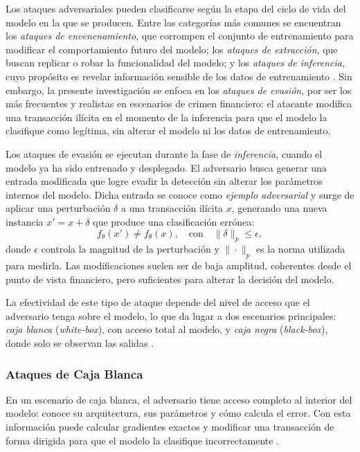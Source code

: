 Los ataques adversariales pueden clasificarse según la etapa del ciclo de vida del modelo en la que se producen. Entre las categorías más comunes se encuentran los \textit{ataques de envenenamiento}, que corrompen el conjunto de entrenamiento para modificar el comportamiento futuro del modelo; los \textit{ataques de extracción}, que buscan replicar o robar la funcionalidad del modelo; y los \textit{ataques de inferencia}, cuyo propósito es revelar información sensible de los datos de entrenamiento \cite{huang2011adversarial}. Sin embargo, la presente investigación se enfoca en los \textit{ataques de evasión}, por ser los más frecuentes y realistas en escenarios de crimen financiero: el atacante modifica una transacción ilícita en el momento de la inferencia para que el modelo la clasifique como legítima, sin alterar el modelo ni los datos de entrenamiento.

Los ataques de evasión se ejecutan durante la fase de \textit{inferencia}, cuando el modelo ya ha sido entrenado y desplegado. El adversario busca generar una entrada modificada que logre evadir la detección sin alterar los parámetros internos del modelo. Dicha entrada se conoce como \textit{ejemplo adversarial} y surge de aplicar una perturbación $\delta$ a una transacción ilícita $x$, generando una nueva instancia $x' = x + \delta$ que produce una clasificación errónea:
\[
f_\theta(x') \neq f_\theta(x), \quad \text{con} \quad \|\delta\|_p \leq \epsilon,
\]
donde $\epsilon$ controla la magnitud de la perturbación y $\|\cdot\|_p$ es la norma utilizada para medirla. Las modificaciones suelen ser de baja amplitud, coherentes desde el punto de vista financiero, pero suficientes para alterar la decisión del modelo.

La efectividad de este tipo de ataque depende del nivel de acceso que el adversario tenga sobre el modelo, lo que da lugar a dos escenarios principales: \textit{caja blanca} (\textit{white-box}), con acceso total al modelo, y \textit{caja negra} (\textit{black-box}), donde solo se observan las salidas \cite{huang2011adversarial}.

\subsubsection{Ataques de Caja Blanca}

En un escenario de caja blanca, el adversario tiene acceso completo al interior del modelo: conoce su arquitectura, sus parámetros y cómo calcula el error. Con esta información puede calcular gradientes exactos y modificar una transacción de forma dirigida para que el modelo la clasifique incorrectamente \cite{madry2018towards}.

